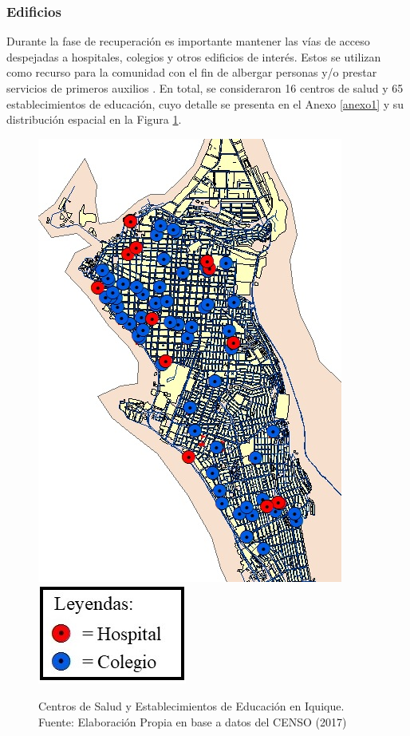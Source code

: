 \documentclass[12pt,a4paper]{article}
\begin{document}
\subsubsection{Edificios}

Durante la fase de recuperación es importante mantener las vías de acceso despejadas a hospitales, colegios y otros edificios de interés. Estos se utilizan como recurso para la comunidad con el fin de albergar personas y/o prestar servicios de primeros auxilios \citet{lindell2006wiley}. En total, se consideraron 16 centros de salud y 65 establecimientos de educación, cuyo detalle se presenta en el Anexo \ref{anexo1} y su distribución espacial en la Figura \ref{fig:fig3}.

\begin{figure}[h!]
	\centering
	\includegraphics[scale=0.65]{Figuras/mapaarc.JPG}
	\includegraphics[scale=0.5]{Figuras/simb1.jpg}
	\caption{Centros de Salud y Establecimientos de Educación en Iquique. Fuente: Elaboración Propia en base a datos del CENSO (2017)}
	\label{fig:fig3}
\end{figure}
\end{document}
